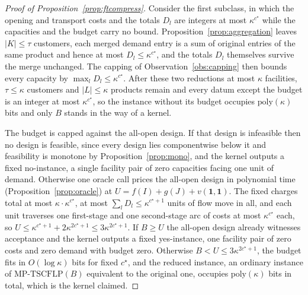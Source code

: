 \begin{proof}[Proof of Proposition~\ref{prop:ftcompress}]
Consider the first subclass, in which the opening and transport costs
and the totals $D_l$ are integers at most $\kappa^{c^\star}$ while the
capacities and the budget carry no bound.
Proposition~\ref{prop:aggregation} leaves $|K|\le\tau$ customers, each
merged demand entry is a sum of original entries of the same product
and hence at most $D_l\le\kappa^{c^\star}$, and the totals $D_l$
themselves survive the merge unchanged. The capping of
Observation~\ref{obs:capping} then bounds every capacity by
$\max_l D_l\le\kappa^{c^\star}$. After these two reductions at most
$\kappa$ facilities, $\tau\le\kappa$ customers and $|L|\le\kappa$
products remain and every datum except the budget is an integer at
most $\kappa^{c^\star}$, so the instance without its budget occupies
$\mathrm{poly}(\kappa)$ bits and only $B$ stands in the way of a
kernel.

The budget is capped against the all-open design. If that design is
infeasible then no design is feasible, since every design lies
componentwise below it and feasibility is monotone by
Proposition~\ref{prop:mono}, and the kernel outputs a fixed
no-instance, a single facility pair of zero capacities facing one unit
of demand. Otherwise one oracle call prices the all-open design in
polynomial time (Proposition~\ref{prop:oracle}) at
$U=f(I)+g(J)+v(\mathbf 1,\mathbf 1)$. The fixed charges total at most
$\kappa\cdot\kappa^{c^\star}$, at most
$\sum_l D_l\le\kappa^{c^\star+1}$ units of flow move in all, and each
unit traverses one first-stage and one second-stage arc of costs at
most $\kappa^{c^\star}$ each, so
$U\le\kappa^{c^\star+1}+2\kappa^{2c^\star+1}\le
3\kappa^{2c^\star+1}$. If $B\ge U$ the all-open design already
witnesses acceptance and the kernel outputs a fixed yes-instance, one
facility pair of zero costs and zero demand with budget zero. Otherwise
$B<U\le 3\kappa^{2c^\star+1}$, the budget fits in $O(\log\kappa)$
bits for fixed $c^\star$, and the reduced instance, an ordinary
instance of $\mathrm{MP\text{-}TSCFLP}(B)$ equivalent to the original
one, occupies $\mathrm{poly}(\kappa)$ bits in total, which is the
kernel claimed.


\end{proof}
